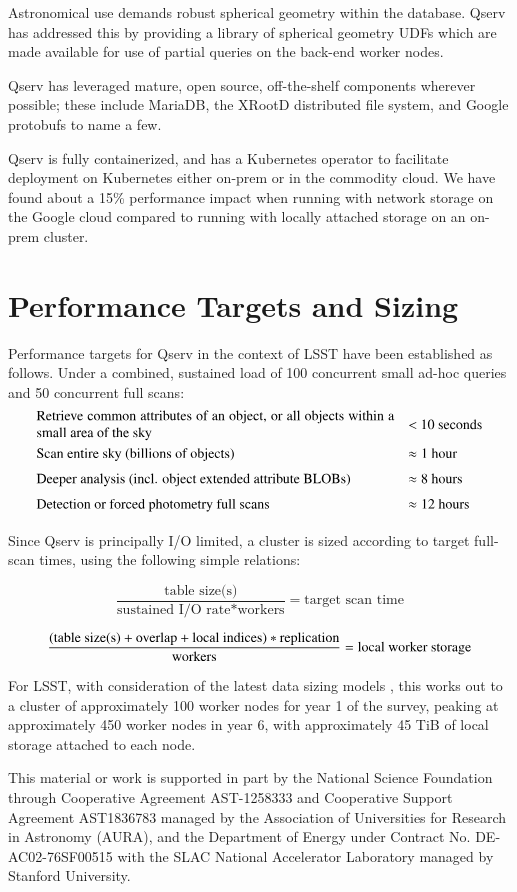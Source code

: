 \documentclass[11pt,twoside]{article}
\begin{document}
Astronomical use demands robust spherical geometry within the database.  Qserv has addressed this by providing
a library of spherical geometry UDFs which are made available for use of partial queries on the back-end
worker nodes.

Qserv has leveraged mature, open source, off-the-shelf components wherever possible; these include MariaDB,
the XRootD distributed file system, and Google protobufs to name a few.

Qserv is fully containerized, and has a Kubernetes operator to facilitate deployment on Kubernetes either
on-prem or in the commodity cloud.  We have found about a 15\% performance impact when running with network
storage on the Google cloud compared to running with locally attached storage on an on-prem cluster.

\section{Performance Targets and Sizing}

Performance targets for Qserv in the context of LSST have been established as follows.  Under a combined,
sustained load of 100 concurrent small ad-hoc queries and 50 concurrent full scans:
\[
{\renewcommand{\arraystretch}{1.5}\begin{array}{ll}
  \parbox{9cm}{Retrieve common attributes of an object, or all objects within a small area of the sky}
    & \mbox{< 10 seconds} \\
  \mbox{Scan entire sky (billions of objects)}
    & \mbox{$\approx{}$1 hour} \\
  \mbox{Deeper analysis (incl. object extended attribute BLOBs)}
    & \mbox{$\approx{}$8 hours} \\
  \mbox{Detection or forced photometry full scans}
    & \mbox{$\approx{}$12 hours} \\
\end{array}}
\]

Since Qserv is principally I/O limited, a cluster is sized according to target full-scan times, using the
following simple relations:

\[
    \frac{\text{table size(s)}}{\text{sustained I/O rate} * \text{workers}} = \text{target scan time}
\]

\[
    \frac{(\text{table size(s)} + \text{overlap} + \text{local indices}) * \text{replication}}
    {\text{workers}} = \text{local worker storage} \\
\]

For LSST, with consideration of the latest data sizing models \citep{DMTN-135}, this works out to a cluster of
approximately 100 worker nodes for year 1 of the survey, peaking at approximately 450 worker nodes in year 6,
with approximately 45 TiB of local storage attached to each node.

\acknowledgements This material or work is supported in part by the National Science Foundation through
Cooperative Agreement AST-1258333 and Cooperative Support Agreement AST1836783 managed by the Association of
Universities for Research in Astronomy (AURA), and the Department of Energy under Contract No.
DE-AC02-76SF00515 with the SLAC National Accelerator Laboratory managed by Stanford University.


\end{document}
